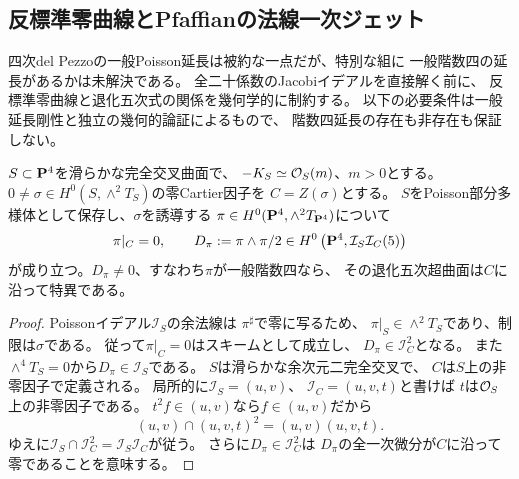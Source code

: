 \subsection{反標準零曲線とPfaffianの法線一次ジェット}
\label{subsec:dp-pfaffian-conormal}
四次del Pezzoの一般Poisson延長は被約な一点だが、特別な組に
一般階数四の延長があるかは未解決である。
全二十係数のJacobiイデアルを直接解く前に、
反標準零曲線と退化五次式の関係を幾何学的に制約する。
以下の必要条件は一般延長剛性と独立の幾何的論証によるもので、
階数四延長の存在も非存在も保証しない。

\begin{proposition}[反標準零曲線への二重消滅]
\label{prop:ci-anticanonical-zero-pfaffian}
$S\subset\mathbf P^4$を滑らかな完全交叉曲面で、
$-K_S\simeq\mathcal O_S(m)$、$m>0$とする。
$0\ne\sigma\in H^0(S,\wedge^2T_S)$の零Cartier因子を
$C=Z(\sigma)$とする。
$S$をPoisson部分多様体として保存し、$\sigma$を誘導する
$\pi\in H^0(\mathbf P^4,\wedge^2T_{\mathbf P^4})$について
\begin{equation}\label{eq:ci-pfaffian-product-ideal}
 \pi|_C=0,\qquad
 D_\pi:=\pi\wedge\pi/2\in
 H^0\left(\mathbf P^4,\mathcal I_S\mathcal I_C(5)\right)
\end{equation}
が成り立つ。$D_\pi\ne0$、すなわち$\pi$が一般階数四なら、
その退化五次超曲面は$C$に沿って特異である。
\end{proposition}
\begin{proof}
Poissonイデアル$\mathcal I_S$の余法線は
$\pi^\sharp$で零に写るため、
$\pi|_S\in\wedge^2T_S$であり、制限は$\sigma$である。
従って$\pi|_C=0$はスキームとして成立し、
$D_\pi\in\mathcal I_C^2$となる。
また$\wedge^4T_S=0$から$D_\pi\in\mathcal I_S$である。
$S$は滑らかな余次元二完全交叉で、
$C$は$S$上の非零因子で定義される。
局所的に$\mathcal I_S=(u,v)$、
$\mathcal I_C=(u,v,t)$と書けば
$t$は$\mathcal O_S$上の非零因子である。
$t^2f\in(u,v)$なら$f\in(u,v)$だから
\[
 (u,v)\cap(u,v,t)^2=(u,v)(u,v,t).
\]
ゆえに$\mathcal I_S\cap\mathcal I_C^2
 =\mathcal I_S\mathcal I_C$が従う。
さらに$D_\pi\in\mathcal I_C^2$は
$D_\pi$の全一次微分が$C$に沿って零であることを意味する。
\end{proof}


